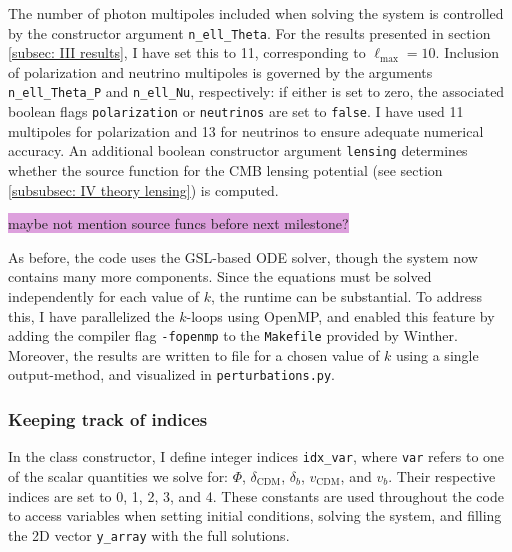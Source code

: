 \documentclass{aa}
\numberwithin{equation}{section}
\numberwithin{table}{section}
\numberwithin{figure}{section}
\begin{document}
The number of photon multipoles included when solving the system is controlled by the constructor argument \verb|n_ell_Theta|. For the results presented in section \ref{subsec: III results}, I have set this to 11, corresponding to $\ell_{\max} = 10$. Inclusion of polarization and neutrino multipoles is governed by the arguments \verb|n_ell_Theta_P| and \verb|n_ell_Nu|, respectively: if either is set to zero, the associated boolean flags \verb|polarization| or \verb|neutrinos| are set to \verb|false|. I have used 11 multipoles for polarization and 13 for neutrinos to ensure adequate numerical accuracy. An additional boolean constructor argument \verb|lensing| determines whether the source function for the CMB lensing potential (see section \ref{subsubsec: IV theory lensing}) is computed.

\colorbox{Plum}{maybe not mention source funcs before next milestone?}

As before, the code uses the GSL-based ODE solver, though the system now contains many more components. Since the equations must be solved independently for each value of $k$, the runtime can be substantial. To address this, I have parallelized the $k$-loops using OpenMP, and enabled this feature by adding the compiler flag \verb|-fopenmp| to the \verb|Makefile| provided by Winther. Moreover, the results are written to file for a chosen value of $k$ using a single output-method, and visualized in \verb|perturbations.py|. 


\subsubsection{Keeping track of indices}  
In the class constructor, I define integer indices \verb|idx_var|, where \verb|var| refers to one of the scalar quantities we solve for: $\Phi$, $\delta_\text{CDM}$, $\delta_b$, $v_\text{CDM}$, and $v_b$. Their respective indices are set to 0, 1, 2, 3, and 4. These constants are used throughout the code to access variables when setting initial conditions, solving the system, and filling the 2D vector \verb|y_array| with the full solutions.
\end{document}
